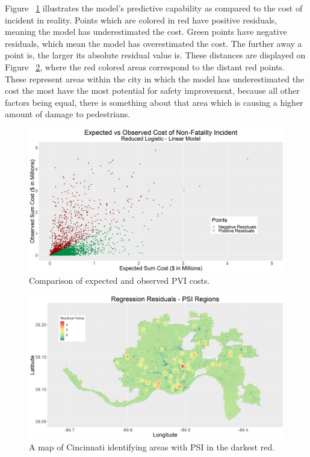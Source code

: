 \documentclass{llncs}
\begin{document}
Figure ~\ref{figure:LinearModelReduced} illustrates the model’s predictive capability as compared to the cost of incident in reality. Points which are colored in red have positive residuals, meaning the model has underestimated the cost. Green points have negative residuals, which mean the model has overestimated the cost. The further away a point is, the larger its absolute residual value is. These distances are displayed on Figure ~\ref{figure:ResidualsPlot}, where the red colored areas correspond to the distant red points. These represent areas within the city in which the model has underestimated the cost the most have the most potential for safety improvement, because all other factors being equal, there is something about that area which is causing a higher amount of damage to pedestrians.
\FloatBarrier
\begin{figure}
\includegraphics[width=\textwidth, height=\textheight, keepaspectratio]{000LinearModelReduced.png}
\caption{Comparison of expected and observed PVI costs.}
\label{figure:LinearModelReduced}
\end{figure}
\FloatBarrier

\FloatBarrier
\begin{figure}
\includegraphics[width=\textwidth, height=\textheight, keepaspectratio]{000ResidualsPlot.png}
\caption{A map of Cincinnati identifying areas with PSI in the darkest red.}
\label{figure:ResidualsPlot}
\end{figure}
\FloatBarrier
\end{document}
